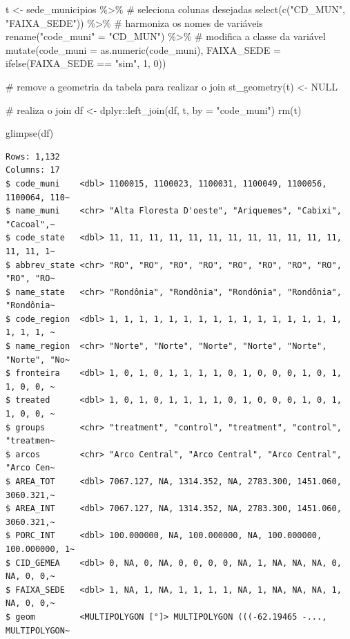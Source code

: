 \documentclass[
  letterpaper,
  DIV=11,
  numbers=noendperiod]{scrartcl}
\newenvironment{Shaded}{\begin{snugshade}}{\end{snugshade}}
\newcommand{\AttributeTok}[1]{\textcolor[rgb]{0.40,0.45,0.13}{#1}}
\newcommand{\CommentTok}[1]{\textcolor[rgb]{0.37,0.37,0.37}{#1}}
\newcommand{\ConstantTok}[1]{\textcolor[rgb]{0.56,0.35,0.01}{#1}}
\newcommand{\DecValTok}[1]{\textcolor[rgb]{0.68,0.00,0.00}{#1}}
\newcommand{\FunctionTok}[1]{\textcolor[rgb]{0.28,0.35,0.67}{#1}}
\newcommand{\NormalTok}[1]{\textcolor[rgb]{0.00,0.23,0.31}{#1}}
\newcommand{\OtherTok}[1]{\textcolor[rgb]{0.00,0.23,0.31}{#1}}
\newcommand{\SpecialCharTok}[1]{\textcolor[rgb]{0.37,0.37,0.37}{#1}}
\newcommand{\StringTok}[1]{\textcolor[rgb]{0.13,0.47,0.30}{#1}}
\begin{document}
\begin{Shaded}
\begin{Highlighting}[]
\NormalTok{t }\OtherTok{\textless{}{-}}\NormalTok{ sede\_municipios }\SpecialCharTok{\%\textgreater{}\%}
  \CommentTok{\# seleciona colunas desejadas}
  \FunctionTok{select}\NormalTok{(}\FunctionTok{c}\NormalTok{(}\StringTok{"CD\_MUN"}\NormalTok{, }\StringTok{"FAIXA\_SEDE"}\NormalTok{)) }\SpecialCharTok{\%\textgreater{}\%}
  \CommentTok{\# harmoniza os nomes de variáveis}
  \FunctionTok{rename}\NormalTok{(}\StringTok{"code\_muni"} \OtherTok{=} \StringTok{"CD\_MUN"}\NormalTok{) }\SpecialCharTok{\%\textgreater{}\%}
  \CommentTok{\# modifica a classe da variável}
  \FunctionTok{mutate}\NormalTok{(}\AttributeTok{code\_muni =} \FunctionTok{as.numeric}\NormalTok{(code\_muni),}
         \AttributeTok{FAIXA\_SEDE =} \FunctionTok{ifelse}\NormalTok{(FAIXA\_SEDE }\SpecialCharTok{==} \StringTok{"sim"}\NormalTok{, }\DecValTok{1}\NormalTok{, }\DecValTok{0}\NormalTok{))}

\CommentTok{\# remove a geometria da tabela para realizar o join}
\FunctionTok{st\_geometry}\NormalTok{(t) }\OtherTok{\textless{}{-}} \ConstantTok{NULL}

\CommentTok{\# realiza o join}
\NormalTok{df }\OtherTok{\textless{}{-}}\NormalTok{ dplyr}\SpecialCharTok{::}\FunctionTok{left\_join}\NormalTok{(df, t, }\AttributeTok{by =} \StringTok{"code\_muni"}\NormalTok{)}
\FunctionTok{rm}\NormalTok{(t)}

\FunctionTok{glimpse}\NormalTok{(df)}
\end{Highlighting}
\end{Shaded}

\begin{verbatim}
Rows: 1,132
Columns: 17
$ code_muni    <dbl> 1100015, 1100023, 1100031, 1100049, 1100056, 1100064, 110~
$ name_muni    <chr> "Alta Floresta D'oeste", "Ariquemes", "Cabixi", "Cacoal",~
$ code_state   <dbl> 11, 11, 11, 11, 11, 11, 11, 11, 11, 11, 11, 11, 11, 11, 1~
$ abbrev_state <chr> "RO", "RO", "RO", "RO", "RO", "RO", "RO", "RO", "RO", "RO~
$ name_state   <chr> "Rondônia", "Rondônia", "Rondônia", "Rondônia", "Rondônia~
$ code_region  <dbl> 1, 1, 1, 1, 1, 1, 1, 1, 1, 1, 1, 1, 1, 1, 1, 1, 1, 1, 1, ~
$ name_region  <chr> "Norte", "Norte", "Norte", "Norte", "Norte", "Norte", "No~
$ fronteira    <dbl> 1, 0, 1, 0, 1, 1, 1, 1, 0, 1, 0, 0, 0, 1, 0, 1, 1, 0, 0, ~
$ treated      <dbl> 1, 0, 1, 0, 1, 1, 1, 1, 0, 1, 0, 0, 0, 1, 0, 1, 1, 0, 0, ~
$ groups       <chr> "treatment", "control", "treatment", "control", "treatmen~
$ arcos        <chr> "Arco Central", "Arco Central", "Arco Central", "Arco Cen~
$ AREA_TOT     <dbl> 7067.127, NA, 1314.352, NA, 2783.300, 1451.060, 3060.321,~
$ AREA_INT     <dbl> 7067.127, NA, 1314.352, NA, 2783.300, 1451.060, 3060.321,~
$ PORC_INT     <dbl> 100.000000, NA, 100.000000, NA, 100.000000, 100.000000, 1~
$ CID_GEMEA    <dbl> 0, NA, 0, NA, 0, 0, 0, 0, NA, 1, NA, NA, NA, 0, NA, 0, 0,~
$ FAIXA_SEDE   <dbl> 1, NA, 1, NA, 1, 1, 1, 1, NA, 1, NA, NA, NA, 1, NA, 0, 0,~
$ geom         <MULTIPOLYGON [°]> MULTIPOLYGON (((-62.19465 -..., MULTIPOLYGON~
\end{verbatim}
\end{document}

